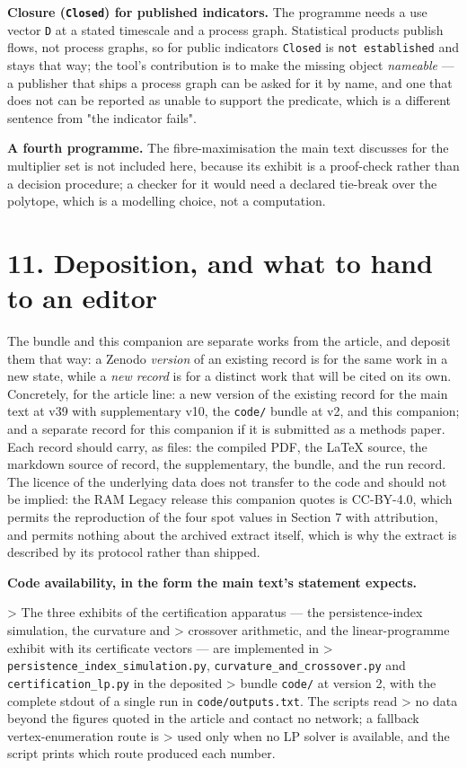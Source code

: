 \documentclass[11pt]{article}
\begin{document}
\textbf{Closure (\texttt{Closed}) for published indicators.} The programme needs a use vector \texttt{D} at a stated timescale and a process graph. Statistical products publish flows, not process graphs, so for public indicators \texttt{Closed} is \texttt{not established} and stays that way; the tool's contribution is to make the missing object \emph{nameable} --- a publisher that ships a process graph can be asked for it by name, and one that does not can be reported as unable to support the predicate, which is a different sentence from "the indicator fails".

\textbf{A fourth programme.} The fibre-maximisation the main text discusses for the multiplier set is not included here, because its exhibit is a proof-check rather than a decision procedure; a checker for it would need a declared tie-break over the polytope, which is a modelling choice, not a computation.

\vspace{0.8em}

\section*{11. Deposition, and what to hand to an editor}\label{11-deposition-and-what-to-hand-to-an-editor}

The bundle and this companion are separate works from the article, and deposit them that way: a Zenodo \emph{version} of an existing record is for the same work in a new state, while a \emph{new record} is for a distinct work that will be cited on its own. Concretely, for the article line: a new version of the existing record for the main text at v39 with supplementary v10, the \texttt{code/} bundle at v2, and this companion; and a separate record for this companion if it is submitted as a methods paper. Each record should carry, as files: the compiled PDF, the LaTeX source, the markdown source of record, the supplementary, the bundle, and the run record. The licence of the underlying data does not transfer to the code and should not be implied: the RAM Legacy release this companion quotes is CC-BY-4.0, which permits the reproduction of the four spot values in Section 7 with attribution, and permits nothing about the archived extract itself, which is why the extract is described by its protocol rather than shipped.

\textbf{Code availability, in the form the main text's statement expects.}

> The three exhibits of the certification apparatus --- the persistence-index simulation, the curvature and > crossover arithmetic, and the linear-programme exhibit with its certificate vectors --- are implemented in > \texttt{persistence\_index\_simulation.py}, \texttt{curvature\_and\_crossover.py} and \texttt{certification\_lp.py} in the deposited > bundle \texttt{code/} at version 2, with the complete stdout of a single run in \texttt{code/outputs.txt}. The scripts read > no data beyond the figures quoted in the article and contact no network; a fallback vertex-enumeration route is > used only when no LP solver is available, and the script prints which route produced each number.
\end{document}
